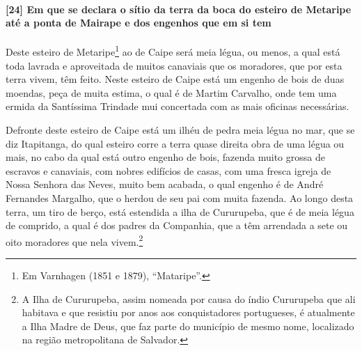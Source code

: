 \begin{linenumbers}
\paragraph{[24] Em que se declara o sítio da terra da boca do esteiro de Metaripe até a
ponta de Mairape e dos engenhos que em si tem}\quad
Deste esteiro de Metaripe\footnote{ Em Varnhagen (1851 e 1879), ``Mataripe''.} ao de Caipe
será meia légua, ou menos, a qual está toda lavrada e aproveitada de muitos canaviais que
os moradores, que por esta terra vivem, têm feito. Neste esteiro de Caipe está um engenho
de bois de duas moendas, peça de muita estima, o qual é de Martim Carvalho, onde tem uma
ermida da Santíssima Trindade mui concertada com as mais oficinas necessárias.

Defronte deste esteiro de Caipe está um ilhéu de pedra meia légua no mar, que se diz
Itapitanga, do qual esteiro corre a terra quase direita obra de uma légua ou mais, no cabo
da qual está outro engenho de bois, fazenda muito grossa de escravos e canaviais, com
nobres edifícios de casas, com uma fresca igreja de Nossa Senhora das Neves, muito bem
acabada, o qual engenho é de André Fernandes Margalho, que o herdou de seu pai com muita
fazenda. Ao longo desta terra, um tiro de berço, está estendida a ilha de Cururupeba, que
é de meia légua de comprido, a qual é dos padres da Companhia, que a têm arrendada a sete
ou oito moradores que nela vivem.\footnote{ A Ilha de Cururupeba, assim nomeada por causa
do índio Cururupeba que ali habitava e que resistiu por anos aos conquistadores
portugueses, é atualmente a Ilha Madre de Deus, que faz parte do município de mesmo nome,
localizado na região metropolitana de Salvador.}


\end{linenumbers}
